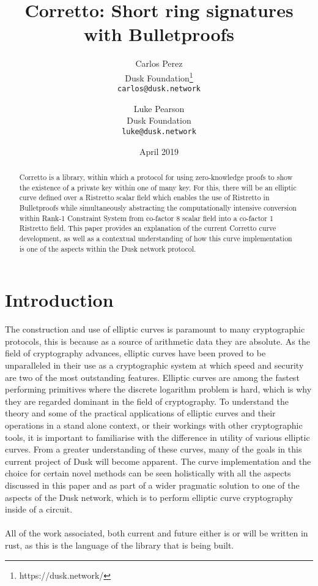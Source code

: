 \documentclass{article}
\title{Corretto: Short ring signatures with Bulletproofs}
\author{
  Carlos Perez\\
  Dusk Foundation\footnote{https://dusk.network/}\\
  \texttt{carlos@dusk.network}
  \and
  Luke Pearson\\
  Dusk Foundation\\
  \texttt{luke@dusk.network}
}
\date{April 2019}
\begin{document}
\maketitle
\thispagestyle{empty}
\pagestyle{empty}

\begin{abstract}
Corretto is a library, within which a protocol for using zero-knowledge proofs to show the existence of a private key within one of many key. For this, there will be an elliptic curve defined over a Ristretto scalar field which enables the use of Ristretto in Bulletproofs while simultaneously abstracting the computationally intensive conversion within Rank-1 Constraint System from co-factor 8 scalar field into a co-factor 1 Ristretto field. This paper provides an explanation of the current Corretto curve development, as well as a contextual understanding of how this curve implementation is one of the aspects within the Dusk network protocol.


\end{abstract}

\newpage

\tableofcontents

\newpage

\section{Introduction}
The construction and use of elliptic curves is paramount to many cryptographic protocols, this is because as a source of arithmetic data they are absolute.  As the field of cryptography advances, elliptic curves have been proved to be unparalleled in their use as a cryptographic system at which speed and security are two of the most outstanding features. Elliptic curves are among the fastest performing primitives where the discrete logarithm problem is hard, which is why they are regarded dominant in the field of cryptography.  To understand the theory and some of the practical applications of elliptic curves and their operations in a stand alone context, or their workings with other cryptographic tools, it is important to familiarise with the difference in utility of various elliptic curves. From a greater understanding of these curves, many of the goals in this current project of Dusk will become apparent.  The curve implementation and the choice for certain novel methods can be seen holistically with all the aspects discussed in this paper and as part of a wider pragmatic solution to one of the aspects of the Dusk network, which is to perform elliptic curve cryptography inside of a circuit. \\\\
All of the work associated, both current and future either is or will be written in rust, as this is the language of the library that is being built.
\end{document}
